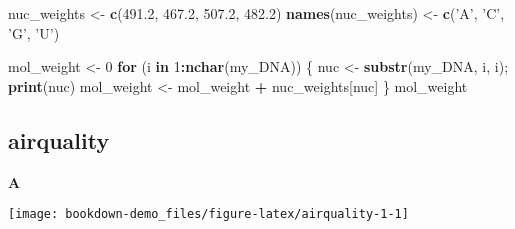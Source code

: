 \documentclass[]{book}
\newenvironment{Shaded}{\begin{snugshade}}{\end{snugshade}}
\newcommand{\ControlFlowTok}[1]{\textcolor[rgb]{0.13,0.29,0.53}{\textbf{#1}}}
\newcommand{\DataTypeTok}[1]{\textcolor[rgb]{0.13,0.29,0.53}{#1}}
\newcommand{\DecValTok}[1]{\textcolor[rgb]{0.00,0.00,0.81}{#1}}
\newcommand{\FloatTok}[1]{\textcolor[rgb]{0.00,0.00,0.81}{#1}}
\newcommand{\KeywordTok}[1]{\textcolor[rgb]{0.13,0.29,0.53}{\textbf{#1}}}
\newcommand{\NormalTok}[1]{#1}
\newcommand{\OperatorTok}[1]{\textcolor[rgb]{0.81,0.36,0.00}{\textbf{#1}}}
\newcommand{\StringTok}[1]{\textcolor[rgb]{0.31,0.60,0.02}{#1}}
\begin{document}
\begin{Shaded}
\begin{Highlighting}[]
\NormalTok{nuc_weights <-}\StringTok{ }\KeywordTok{c}\NormalTok{(}\FloatTok{491.2}\NormalTok{, }\FloatTok{467.2}\NormalTok{, }\FloatTok{507.2}\NormalTok{, }\FloatTok{482.2}\NormalTok{)}
\KeywordTok{names}\NormalTok{(nuc_weights) <-}\StringTok{ }\KeywordTok{c}\NormalTok{(}\StringTok{'A'}\NormalTok{, }\StringTok{'C'}\NormalTok{, }\StringTok{'G'}\NormalTok{, }\StringTok{'U'}\NormalTok{)}

\NormalTok{mol_weight <-}\StringTok{ }\DecValTok{0}
\ControlFlowTok{for}\NormalTok{ (i }\ControlFlowTok{in} \DecValTok{1}\OperatorTok{:}\KeywordTok{nchar}\NormalTok{(my_DNA)) \{}
\NormalTok{        nuc <-}\StringTok{ }\KeywordTok{substr}\NormalTok{(my_DNA, i, i);}
        \KeywordTok{print}\NormalTok{(nuc)}
\NormalTok{        mol_weight <-}\StringTok{ }\NormalTok{mol_weight }\OperatorTok{+}\StringTok{ }\NormalTok{nuc_weights[nuc]}
\NormalTok{\}}
\NormalTok{mol_weight}
\end{Highlighting}
\end{Shaded}

\hypertarget{airquality-1}{%
\subsection{airquality}\label{airquality-1}}

\textbf{A}

\begin{Shaded}
\end{Shaded}

\begin{center}\texttt{[image: bookdown-demo\_files/figure-latex/airquality-1-1]} \end{center}
\end{document}
